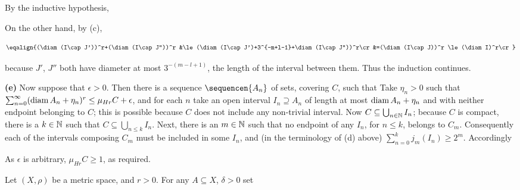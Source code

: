 {

\noindent By the inductive hypothesis,


\noindent On the other hand, by (c),

$$\eqalign{(\diam(I\cap J'))^r+(\diam(I\cap J''))^r
&\le(\diam(I\cap J')+3^{-m+l-1}+\diam(I\cap J''))^r\cr
&=(\diam(I\cap J))^r
\le(\diam I)^r\cr}$$

\noindent because $J'$, $J''$ both have diameter at most $3^{-(m-l+1)}$,
the length of the interval between them.
Thus the induction continues.\ \Qed

\medskip

{\bf (e)} Now suppose that $\epsilon>0$.   Then there is a sequence
$\sequencen{A_n}$ of sets, covering $C$, such that
Take $\eta_n>0$ such that
$\sum_{n=0}^{\infty}(\mathop{\text{diam}} A_n+\eta_n)^r\le\mu_{Hr}C+\epsilon$, and for
each $n$ take an open
interval $I_n\supseteq A_n$ of length at most $\mathop{\text{diam}} A_n+\eta_n$ and
with neither endpoint belonging to $C$;  this is possible because $C$
does not include any non-trivial interval.   Now
$C\subseteq\bigcup_{n\in\Bbb N}I_n$;  because $C$ is compact, there is a
$k\in\Bbb N$ such that $C\subseteq\bigcup_{n\le k}I_n$.   Next, there is
an $m\in\Bbb N$ such that no endpoint of any $I_n$, for $n\le k$,
belongs to $C_m$.   Consequently each of the intervals composing $C_m$
must be included in some $I_n$, and
(in the terminology of (d) above) $\sum_{n=0}^kj_m(I_n)\ge 2^m$.
Accordingly


\noindent As $\epsilon$ is arbitrary, $\mu_{Hr}C\ge 1$, as required.
}%

 Let $(X,\rho)$ be a metric space, and $r>0$.   For any $A\subseteq X$,
$\delta>0$ set

